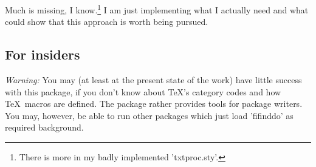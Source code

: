 \documentclass{article}
\begin{document}
Much is missing, I know.\footnote{There 
  is more in my badly implemented 'txtproc.sty'.}
I am just implementing what I actually need 
and what could show that this approach is worth being pursued. 

\subsection{For insiders}

\emph{Warning:} You may (at least at the present state of the work) 
have little success with this package, if you don't know about 
\TeX's category codes and how \TeX\ macros are defined. 
The package rather provides tools for package writers. 
You may, however, be able to run other packages which just load 
'fifinddo' as required background.
\end{document}
